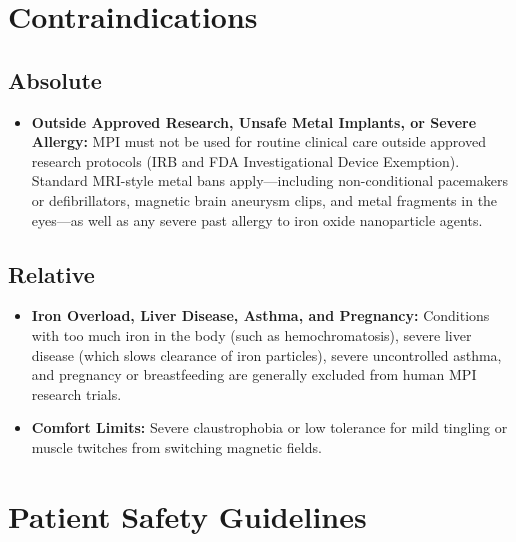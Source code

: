 \section{Contraindications}

\subsection{Absolute}

\begin{itemize}
    \item \textbf{Outside Approved Research, Unsafe Metal Implants, or Severe Allergy:} MPI must not be used for routine clinical care outside approved research protocols (IRB and FDA Investigational Device Exemption). Standard MRI-style metal bans apply---including non-conditional pacemakers or defibrillators, magnetic brain aneurysm clips, and metal fragments in the eyes---as well as any severe past allergy to iron oxide nanoparticle agents.
\end{itemize}

\subsection{Relative}

\begin{itemize}
    \item \textbf{Iron Overload, Liver Disease, Asthma, and Pregnancy:} Conditions with too much iron in the body (such as hemochromatosis), severe liver disease (which slows clearance of iron particles), severe uncontrolled asthma, and pregnancy or breastfeeding are generally excluded from human MPI research trials.
    \item \textbf{Comfort Limits:} Severe claustrophobia or low tolerance for mild tingling or muscle twitches from switching magnetic fields.
\end{itemize}

\section{Patient Safety Guidelines}

